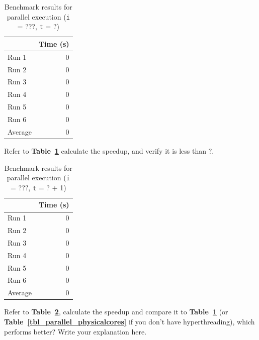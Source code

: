 \documentclass[12pt]{article}
\newcommand{\iterations}{???}
\newcommand{\virtualcpus}{?}
\begin{document}
\begin{table}[H]
  \centering
  \begin{tabular}{lr}
    & {\bf Time (s)} \\
    \hline
    Run 1 & 0 \\
    Run 2 & 0 \\
    Run 3 & 0 \\
    Run 4 & 0 \\
    Run 5 & 0 \\
    Run 6 & 0 \\
    \hline
    Average & 0 \\
  \end{tabular}
  \caption{Benchmark results for parallel execution ({\tt i} = \iterations{},
    {\tt t} = \virtualcpus{})}
  \label{tbl_parallel_virtualcpus}
\end{table}

Refer to {\bf Table~\ref{tbl_parallel_virtualcpus}} calculate the speedup, and
verify it is less than \virtualcpus{}.

\begin{table}[H]
  \centering
  \begin{tabular}{lr}
    & {\bf Time (s)} \\
    \hline
    Run 1 & 0 \\
    Run 2 & 0 \\
    Run 3 & 0 \\
    Run 4 & 0 \\
    Run 5 & 0 \\
    Run 6 & 0 \\
    \hline
    Average & 0 \\
  \end{tabular}
  \caption{Benchmark results for parallel execution ({\tt i} = \iterations{},
    {\tt t} = \virtualcpus{} + 1)}
  \label{tbl_parallel_virtualcpus_plus_one}
\end{table}

Refer to {\bf Table~\ref{tbl_parallel_virtualcpus_plus_one}}, calculate the
speedup and compare it to {\bf Table~\ref{tbl_parallel_virtualcpus}} (or
{\bf Table~\ref{tbl_parallel_physicalcores}} if you don't have hyperthreading),
which performs better? Write your explanation here.
\end{document}
